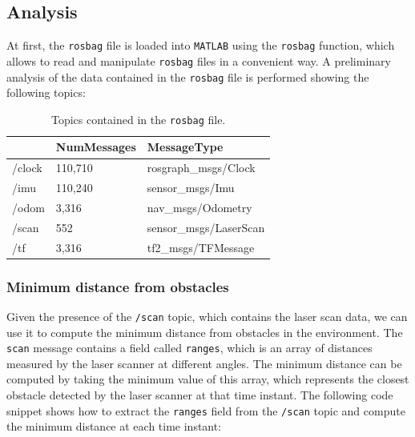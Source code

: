 \subsection{Analysis}
\label{subsec:analysis_part_A}

At first, the \texttt{rosbag} file is loaded into \texttt{MATLAB} using the \texttt{rosbag} function, which allows to read and manipulate \texttt{rosbag} files in a convenient way.
A preliminary analysis of the data contained in the \texttt{rosbag} file is performed showing the following topics:



\begin{table}[H]
    \centering
    \begin{tabular}{l|l|l}
        ~      & \textbf{NumMessages} & \textbf{MessageType}   \\
        \hline
        /clock & 110,710              & rosgraph\_msgs/Clock   \\
        /imu   & 110,240              & sensor\_msgs/Imu       \\
        /odom  & 3,316                & nav\_msgs/Odometry     \\
        /scan  & 552                  & sensor\_msgs/LaserScan \\
        /tf    & 3,316                & tf2\_msgs/TFMessage    \\
        \hline
    \end{tabular}
    \caption{Topics contained in the \texttt{rosbag} file.}
    \label{tab:rosbag_topics}
\end{table}


\subsubsection{Minimum distance from obstacles}
\label{subsubsec:minimum_distance}

Given the presence of the \texttt{/scan} topic, which contains the laser scan data, we can use it to compute the minimum distance from obstacles in the environment.
The \texttt{scan} message contains a field called \texttt{ranges}, which is an array of distances measured by the laser scanner at different angles.
The minimum distance can be computed by taking the minimum value of this array, which represents the closest obstacle detected by the laser scanner at that time instant.
The following code snippet shows how to extract the \texttt{ranges} field from the \texttt{/scan} topic and compute the minimum distance at each time instant:

